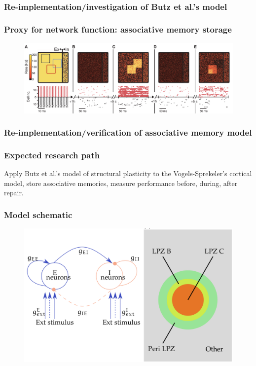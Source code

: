 \begin{frame}[c]
  \frametitle{Re-implementation/investigation of Butz et al.'s model}
  
\end{frame}
\begin{frame}[c]
  \frametitle{Proxy for network function: associative memory storage}
  \begin{figure}[h]
    \centering
    \includegraphics[width=\linewidth]{99_images/vogels-figure4}
  \end{figure}
\end{frame}
\begin{frame}[c]
  \frametitle{Re-implementation/verification of associative memory model}
  \begin{figure}[htpb]
  \begin{subfigure}[h]{0.3\textwidth}
    \resizebox{1.2\textwidth}{!}{}
  \end{subfigure}
  \begin{subfigure}[h]{0.3\textwidth}
    \resizebox{1.2\textwidth}{!}{}
  \end{subfigure}
  \begin{subfigure}[c]{0.3\textwidth}
    \resizebox{1.2\textwidth}{!}{}
  \end{subfigure}
  \end{figure}
\end{frame}
\begin{frame}[c]
  \frametitle{Expected research path}
  Apply Butz et al.'s model of structural plasticity to the Vogels-Sprekeler's cortical model, store associative memories, measure performance before, during, after repair.
\end{frame}
\begin{frame}[c]
  \frametitle{Model schematic}
  \begin{figure}[h]
    \centering
    \includegraphics[width=0.8\linewidth]{99_images/schematic}
  \end{figure}
\end{frame}
